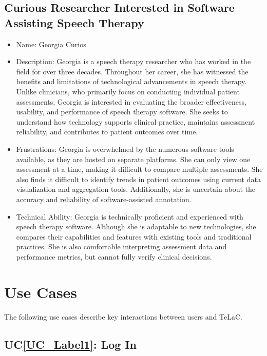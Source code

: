 \documentclass[12pt]{article}
\newcounter{ucnum} %
\newcommand{\ucref}[1]{UC\ref{#1}}
\begin{document}
\subsection{Curious Researcher Interested in Software Assisting Speech Therapy}
\begin{itemize}
\item Name: Georgia Curios
\item Description: Georgia is a speech therapy researcher who has worked in the field for over three decades. Throughout her career, she has witnessed the benefits and limitations of technological advancements in speech therapy. Unlike clinicians, who primarily focus on conducting individual patient assessments, Georgia is interested in evaluating the broader effectiveness, usability, and performance of speech therapy software. She seeks to understand how technology supports clinical practice, maintains assessment reliability, and contributes to patient outcomes over time.
\item Frustrations: Georgia is overwhelmed by the numerous software tools available, as they are hosted on separate platforms. She can only view one assessment at a time, making it difficult to compare multiple assessments. She also finds it difficult to identify trends in patient outcomes using current data visualization and aggregation tools. Additionally, she is uncertain about the accuracy and reliability of software-assisted annotation.
\item Technical Ability: Georgia is technically proficient and experienced with speech therapy software. Although she is adaptable to new technologies, she compares their capabilities and features with existing tools and traditional practices. She is also comfortable interpreting assessment data and performance metrics, but cannot fully verify clinical decisions.
\end{itemize}
\section{Use Cases} \label{sec:UseCases}
The following use cases describe key interactions between users and TeLaC.

  


 \label{UC_Label1}
\subsection{\ucref{UC_Label1}: Log In}
\end{document}
